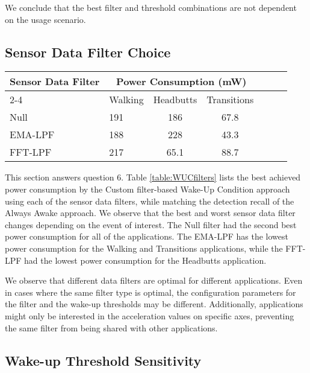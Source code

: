 We conclude that the best filter and threshold combinations are not dependent on the usage scenario.
\fi

\subsection{Sensor Data Filter Choice}

\begin{table*}[t]
    \begin{tabular}{|l|l|c|c|c|c|c|}
	\hline
    \multirow{2}{*}{Sensor Data Filter}    	& \multicolumn{3}{c|}{Power Consumption (mW)} \\ \cline{2-4}
							& Walking	& Headbutts	& Transitions 	\\ \hline
    Null     				& 191		& 186		& 67.8 			\\ \hline
	EMA-LPF   				& 188		& 228		& 43.3 			\\ \hline
	FFT-LPF 				& 217		& 65.1 		& 88.7 			\\ \hline
	
    \end{tabular}
	\caption{Summary of best achieved power consumption for each of the sensor data filters for Group 2}
	\label{table:WUCfilters}
\end{table*}

This section answers question 6. Table \ref{table:WUCfilters} lists the best achieved power consumption by the Custom filter-based Wake-Up Condition approach using each of the sensor data filters, while matching the detection recall of the Always Awake approach. We observe that the best and worst sensor data filter changes depending on the event of interest. The Null filter had the second best power consumption for all of the applications. The EMA-LPF has the lowest power consumption for the Walking and Transitions applications, while the FFT-LPF had the lowest power consumption for the Headbutts application. 

We observe that different data filters are optimal for different applications. Even in cases where the same filter type is optimal, the configuration parameters for the filter and the wake-up thresholds may be different. Additionally, applications might only be interested in the acceleration values on specific axes, preventing the same filter from being shared with other applications.

\subsection{Wake-up Threshold Sensitivity}

